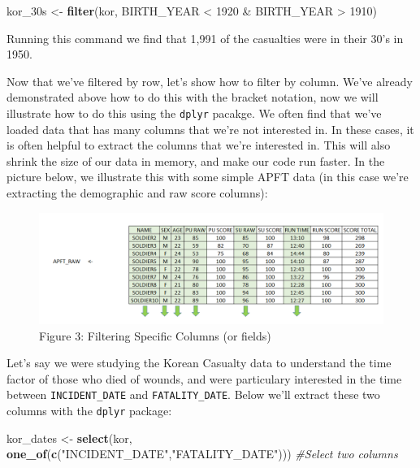 \documentclass[]{book}
\newenvironment{Shaded}{\begin{snugshade}}{\end{snugshade}}
\newcommand{\KeywordTok}[1]{\textcolor[rgb]{0.13,0.29,0.53}{\textbf{{#1}}}}
\newcommand{\DecValTok}[1]{\textcolor[rgb]{0.00,0.00,0.81}{{#1}}}
\newcommand{\StringTok}[1]{\textcolor[rgb]{0.31,0.60,0.02}{{#1}}}
\newcommand{\CommentTok}[1]{\textcolor[rgb]{0.56,0.35,0.01}{\textit{{#1}}}}
\newcommand{\NormalTok}[1]{{#1}}
\begin{document}
\begin{Shaded}
\begin{Highlighting}[]
\NormalTok{kor_30s <-}\StringTok{ }\KeywordTok{filter}\NormalTok{(kor, BIRTH_YEAR <}\StringTok{ }\DecValTok{1920} \NormalTok{&}\StringTok{ }\NormalTok{BIRTH_YEAR >}\StringTok{ }\DecValTok{1910}\NormalTok{)}
\end{Highlighting}
\end{Shaded}

Running this command we find that 1,991 of the casualties were in their
30's in 1950.

Now that we've filtered by row, let's show how to filter by column.
We've already demonstrated above how to do this with the bracket
notation, now we will illustrate how to do this using the \texttt{dplyr}
pacakge. We often find that we've loaded data that has many columns that
we're not interested in. In these cases, it is often helpful to extract
the columns that we're interested in. This will also shrink the size of
our data in memory, and make our code run faster. In the picture below,
we illustrate this with some simple APFT data (in this case we're
extracting the demographic and raw score columns):

\begin{figure}[htbp]
\centering
\includegraphics{filterColumn.PNG}
\caption{Figure 3: Filtering Specific Columns (or fields)}
\end{figure}

Let's say we were studying the Korean Casualty data to understand the
time factor of those who died of wounds, and were particulary interested
in the time between \texttt{INCIDENT\_DATE} and \texttt{FATALITY\_DATE}.
Below we'll extract these two columns with the \texttt{dplyr} package:

\begin{Shaded}
\begin{Highlighting}[]
\NormalTok{kor_dates <-}\StringTok{ }\KeywordTok{select}\NormalTok{(kor, }\KeywordTok{one_of}\NormalTok{(}\KeywordTok{c}\NormalTok{(}\StringTok{"INCIDENT_DATE"}\NormalTok{,}\StringTok{"FATALITY_DATE"}\NormalTok{))) }\CommentTok{#Select two columns}
\end{Highlighting}
\end{Shaded}
\end{document}
